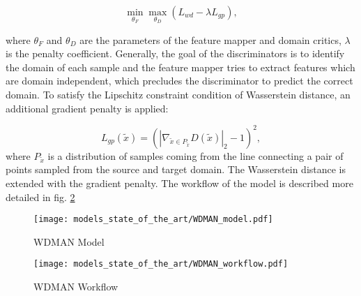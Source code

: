 \begin{equation}
    \min_{\theta_{F}} \max_{\theta_{D}} (L_{wd} - \lambda L_{gp}), 
\end{equation}

where $\theta_{F}$ and $\theta_{D}$ are the parameters of the feature mapper and domain critics, $\lambda$ is the penalty coefficient. Generally, the goal of the discriminators is to identify the domain of each sample and the feature mapper tries to extract features which are domain independent, which precludes the discriminator to predict the correct domain. To satisfy the Lipschitz constraint condition of Wasserstein distance, an additional gradient penalty is applied: 

\begin{equation}
     L_{gp}(\tilde{x}) = (|\nabla_{\tilde{x} \in P_{\tilde{x}}} D(\tilde{x})|_{2}-1)^{2}, 
\end{equation}
where $P_{\tilde{x}}$ is a distribution of samples coming from the line connecting a pair of points sampled from the source and target domain. The Wasserstein distance is extended with the gradient penalty. The workflow of the model is described more detailed in fig. \ref{fig:WDMAN_workflow}
 \begin{figure}[H]
  \centering
  \texttt{[image: models\_state\_of\_the\_art/WDMAN\_model.pdf]}
  \caption{WDMAN Model \cite{Zhang2019}}
  \label{fig:WDMAN_model}
\end{figure}
 
\begin{figure}[H]
  \centering
  \texttt{[image: models\_state\_of\_the\_art/WDMAN\_workflow.pdf]}
  \caption{WDMAN Workflow \cite{Zhang2019}}
  \label{fig:WDMAN_workflow}
\end{figure}
 
 
